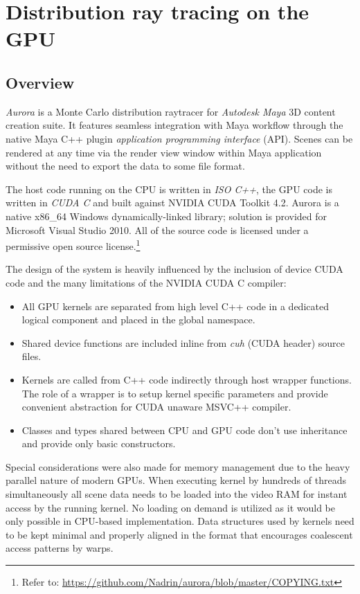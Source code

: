 \chapter{Distribution ray tracing on the GPU}
\label{ch:raytracing}

\section{Overview}
\emph{Aurora} is a Monte Carlo distribution raytracer for \emph{Autodesk Maya} 3D content creation suite. It features seamless integration with Maya workflow through the native Maya C++ plugin \emph{application programming interface} (API). Scenes can be rendered at any time via the render view window within Maya application without the need to export the data to some file format.

The host code running on the CPU is written in \emph{ISO C++}, the GPU code is written in \emph{CUDA C} and built against NVIDIA CUDA Toolkit 4.2. Aurora is a native x86\_64 Windows dynamically-linked library; solution is provided for Microsoft Visual Studio 2010. All of the source code is licensed under a permissive open source license.\footnote{Refer to: \url{https://github.com/Nadrin/aurora/blob/master/COPYING.txt}}

The design of the system is heavily influenced by the inclusion of device CUDA code and the many limitations of the NVIDIA CUDA C compiler:
\begin{itemize}
\item All GPU kernels are separated from high level C++ code in a dedicated logical component and placed in the global namespace.
\item Shared device functions are included inline from \emph{cuh} (CUDA header) source files.
\item Kernels are called from C++ code indirectly through host wrapper functions. The role of a wrapper is to setup kernel specific parameters and provide convenient abstraction for CUDA unaware MSVC++ compiler.
\item Classes and types shared between CPU and GPU code don't use inheritance and provide only basic constructors.
\end{itemize}
Special considerations were also made for memory management due to the heavy parallel nature of modern GPUs. When executing kernel by hundreds of threads simultaneously all scene data needs to be loaded into the video RAM for instant access by the running kernel. No loading on demand is utilized as it would be only possible in CPU-based implementation. Data structures used by kernels need to be kept minimal and properly aligned in the format that encourages coalescent access patterns by warps.

